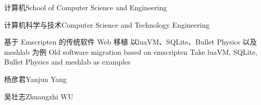 
\school
{计算机}{School of Computer Science and Engineering}

\major
{计算机科学与技术}{Computer Science and Technology Engineering}

\thesistitle
{基于 Emscripten 的传统软件 Web 移植}
{以luaVM、SQLite、Bullet Physics 以及 meshlab 为例}
{Old software migration based on emscripten}
{Take luaVM, SQLite, Bullet Physics and meshlab as examples}

\thesisauthor
{杨彦君}{Yanjun Yang}

\teacher
{\quad 吴壮志}{Zhuangzhi WU}






